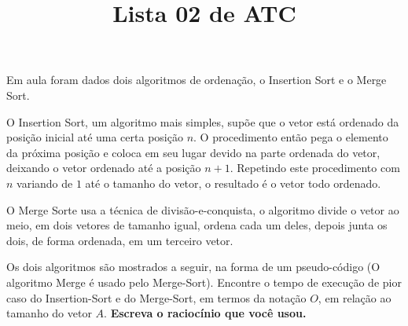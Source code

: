 \documentclass[12pt]{article}
\title{Lista 02 de ATC}
\date{}
\author{}
\begin{document}
\maketitle


\vspace{3em}

Em aula foram dados dois algoritmos de ordenação, o Insertion Sort e o Merge Sort. 

O Insertion Sort, um algoritmo mais simples, supõe que o vetor está ordenado da posição inicial até uma certa posição $n$. O procedimento então pega o elemento da próxima posição e coloca em seu lugar devido na parte ordenada do vetor, deixando o vetor ordenado até a posição $n+1$.
Repetindo este procedimento com $n$ variando de $1$ até o tamanho do vetor, o resultado é o vetor todo ordenado.

O Merge Sorte usa a técnica de divisão-e-conquista, o algoritmo divide o vetor ao meio, em dois vetores de tamanho igual, ordena cada um deles, depois junta os dois, de forma ordenada, em um terceiro vetor.

Os dois algoritmos são mostrados a seguir, na forma de um pseudo-código (O algoritmo Merge é usado pelo Merge-Sort).
Encontre o tempo de execução de pior caso do Insertion-Sort e do Merge-Sort, em termos da notação $O$, em relação ao tamanho do vetor $A$. \textbf{Escreva o raciocínio que você usou.}







\end{document}
